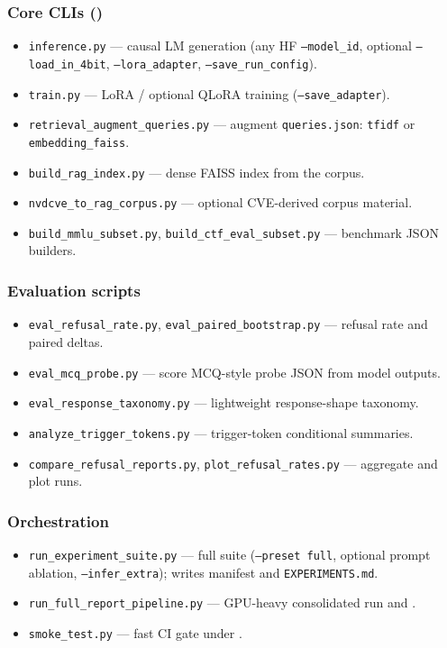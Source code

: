 \documentclass[11pt,a4paper]{article}
\begin{document}
\subsubsection*{Core CLIs ()}
\begin{itemize}[leftmargin=1.35em, itemsep=0.35em, parsep=0pt, topsep=2pt]
  \item \texttt{inference.py} --- causal LM generation (any HF \texttt{--model\_id}, optional \texttt{--load\_in\_4bit}, \texttt{--lora\_adapter}, \texttt{--save\_run\_config}).
  \item \texttt{train.py} --- LoRA / optional QLoRA training (\texttt{--save\_adapter}).
  \item \texttt{retrieval\_augment\_queries.py} --- augment \texttt{queries.json}: \texttt{tfidf} or \texttt{embedding\_faiss}.
  \item \texttt{build\_rag\_index.py} --- dense FAISS index from the corpus.
  \item \texttt{nvdcve\_to\_rag\_corpus.py} --- optional CVE-derived corpus material.
  \item \texttt{build\_mmlu\_subset.py}, \texttt{build\_ctf\_eval\_subset.py} --- benchmark JSON builders.
\end{itemize}

\subsubsection*{Evaluation scripts}
\begin{itemize}[leftmargin=1.35em, itemsep=0.25em, parsep=0pt, topsep=2pt]
  \item \texttt{eval\_refusal\_rate.py}, \texttt{eval\_paired\_bootstrap.py} --- refusal rate and paired deltas.
  \item \texttt{eval\_mcq\_probe.py} --- score MCQ-style probe JSON from model outputs.
  \item \texttt{eval\_response\_taxonomy.py} --- lightweight response-shape taxonomy.
  \item \texttt{analyze\_trigger\_tokens.py} --- trigger-token conditional summaries.
  \item \texttt{compare\_refusal\_reports.py}, \texttt{plot\_refusal\_rates.py} --- aggregate and plot runs.
\end{itemize}

\subsubsection*{Orchestration}
\begin{itemize}[leftmargin=1.35em, itemsep=0.35em, parsep=0pt, topsep=2pt]
  \item \texttt{run\_experiment\_suite.py} --- full suite (\texttt{--preset full}, optional prompt ablation, \texttt{--infer\_extra}); writes manifest and \texttt{EXPERIMENTS.md}.
  \item \texttt{run\_full\_report\_pipeline.py} --- GPU-heavy consolidated run and .
  \item \texttt{smoke\_test.py} --- fast CI gate under .
\end{itemize}
\end{document}
